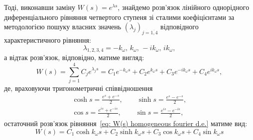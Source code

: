 \documentclass{mathreport}
\begin{document}
\newpage
Тоді, виконавши заміну $W(s)=e^{\lambda s}$, знайдемо розв'язок лінійного однорідного диференціального рівняння четвертого ступеня зі сталими коефіцієнтами за методологією пошуку власних значень $\left( \lambda_j \right)_{j=\overline{1,4}}$ відповідного характеристичного рівняння:
\begin{equation}\label{eq: eigenvalues}
    \lambda_{1,2,3,4} = -k_{\omega},\, k_{\omega},\, -ik_{\omega},\, ik_{\omega},
\end{equation} 
а відтак розв'язок, відповідно, матиме вигляд:
\begin{equation}\label{eq: solution of homogeneous d.e.}
    W(s) = \sum\limits_{j=1}^{4} C_j e^{\lambda_j s} = C_1e^{-k_{\omega} s} + C_2e^{k_{\omega} s} + C_3e^{-ik_{\omega} s} + C_4e^{ik_{\omega} s},
\end{equation} 
де, враховуючи тригонометричні співвідношення
\begin{align}\label{eq: trigonometric ratios}
    \cosh{s} = \frac{e^{s}+e^{-s}}{2}, \qquad \sinh{s} = \frac{e^{s}-e^{-s}}{2}, \\
    \cos{s} = \frac{e^{is}+e^{-is}}{2}, \qquad \sin{s} = \frac{e^{is}-e^{-is}}{2},
\end{align}
остаточний розв'язок рівняння~\eqref{eq: W(s) homogeneous fourier d.e.} матиме вид:
\begin{equation}\label{eq: final solution of homogeneous d.e.}
    W(s) = C_1\cosh{k_{\omega} s} + C_2\sinh{k_{\omega} s} + C_3\cos{k_{\omega} s} + C_4\sin{k_{\omega} s}
\end{equation}
\end{document}
